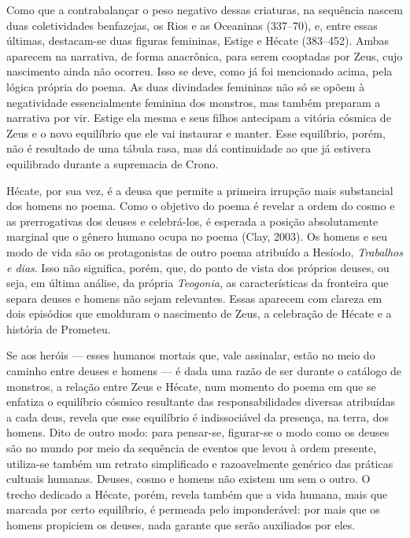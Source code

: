 Como que a contrabalançar o peso negativo dessas criaturas, na sequência
nascem duas coletividades benfazejas, os Rios e as Oceaninas (337--70),
e, entre essas últimas, destacam-se duas figuras femininas, Estige e
Hécate (383--452). Ambas aparecem na narrativa, de forma anacrônica, para
serem cooptadas por Zeus, cujo nascimento ainda não ocorreu. Isso se
deve, como já foi mencionado acima, pela lógica própria do poema. As
duas divindades femininas não só se opõem à negatividade essencialmente
feminina dos monstros, mas também preparam a narrativa por vir. Estige
ela mesma e seus filhos antecipam a vitória cósmica de Zeus e o novo
equilíbrio que ele vai instaurar e manter. Esse equilíbrio, porém, não é
resultado de uma tábula rasa, mas dá continuidade ao que já estivera
equilibrado durante a supremacia de Crono.

Hécate, por sua vez, é a deusa que permite a primeira irrupção mais
substancial dos homens no poema. Como o objetivo do poema é revelar a
ordem do cosmo e as prerrogativas dos deuses e celebrá-los, é esperada a
posição absolutamente marginal que o gênero humano ocupa no poema (Clay,
2003). Os homens e seu modo de vida são os protagonistas de outro poema
atribuído a Hesíodo, \textit{Trabalhos e dias}. Isso não significa, porém,
que, do ponto de vista dos próprios deuses, ou seja, em última análise,
da própria \textit{Teogonia}, as características da fronteira que separa
deuses e homens não sejam relevantes. Essas aparecem com clareza em dois
episódios que emolduram o nascimento de Zeus, a celebração de Hécate e a
história de Prometeu.

Se aos heróis --- esses humanos mortais que, vale assinalar, estão no
meio do caminho entre deuses e homens --- é dada uma razão de ser durante
o catálogo de monstros, a relação entre Zeus e Hécate, num momento do
poema em que se enfatiza o equilíbrio cósmico resultante das
responsabilidades diversas atribuídas a cada deus, revela que esse
equilíbrio é indissociável da presença, na terra, dos homens. Dito de
outro modo: para pensar-se, figurar-se o modo como os deuses são no
mundo por meio da sequência de eventos que levou à ordem presente,
utiliza-se também um retrato simplificado e razoavelmente genérico das
práticas cultuais humanas. Deuses, cosmo e homens não existem um sem o
outro. O trecho dedicado a Hécate, porém, revela também que a vida
humana, mais que marcada por certo equilíbrio, é permeada pelo
imponderável: por mais que os homens propiciem os deuses, nada garante
que serão auxiliados por eles.

